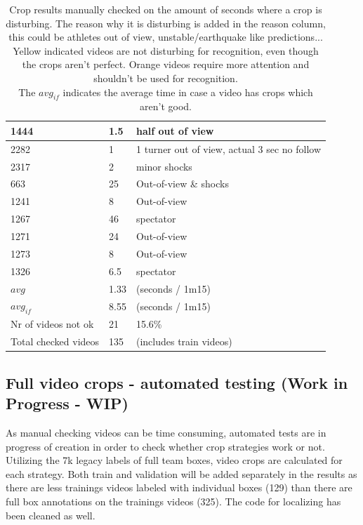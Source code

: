 \begin{table}[h!]
\begin{tabular}{|l|l|l|}
        1444 &	\cellcolor{yellow!25} 1.5  &	half out of view \\ \hline
        2282 &	\cellcolor{yellow!25} 1    &	1 turner out of view, actual 3 sec no follow \\ \hline
        2317 &	\cellcolor{yellow!25} 2    &	minor shocks \\ \hline
        663  &	\cellcolor{orange!25} 25   &	Out-of-view \& shocks \\ \hline
        1241 &	\cellcolor{orange!25} 8    &	Out-of-view \\ \hline
        1267 &	\cellcolor{orange!25} 46   &	spectator \\ \hline
        1271 &	\cellcolor{orange!25} 24   &	Out-of-view \\ \hline
        1273 &	\cellcolor{orange!25} 8    &	Out-of-view \\ \hline
        1326 &	\cellcolor{orange!25} 6.5  &	spectator \\ \hline
        \(avg\) &	1.33 &	(seconds / 1m15) \\ \hline
        \(avg_{if}\) &	8.55 &	(seconds / 1m15) \\ \hline
        Nr of videos not ok &	21	& 15.6\% \\ \hline
        Total checked videos &	135	& (includes train videos) \\ \hline
    \end{tabular}
    \caption[Manually checked crop results]{Crop results manually checked on the amount of seconds where a crop is disturbing. The reason why it is disturbing is added in the reason column, this could be athletes out of view, unstable/earthquake like predictions... \\
    Yellow indicated videos are not disturbing for recognition, even though the crops aren't perfect. Orange videos require more attention and shouldn't be used for recognition. \\
    The \(avg_{if}\) indicates the average time in case a video has crops which aren't good.}
    \label{tbl:crop-results}
\end{table}


\subsection{Full video crops - automated testing (Work in Progress - WIP)}

As manual checking videos can be time consuming, automated tests are in progress of creation in order to check whether crop strategies work or not.
Utilizing the 7k legacy labels of full team boxes, video crops are calculated for each strategy.
Both train and validation will be added separately in the results as there are less trainings videos labeled with individual boxes (129) than there are full box annotations on the trainings videos (325).
The code for localizing has been cleaned as well. %














